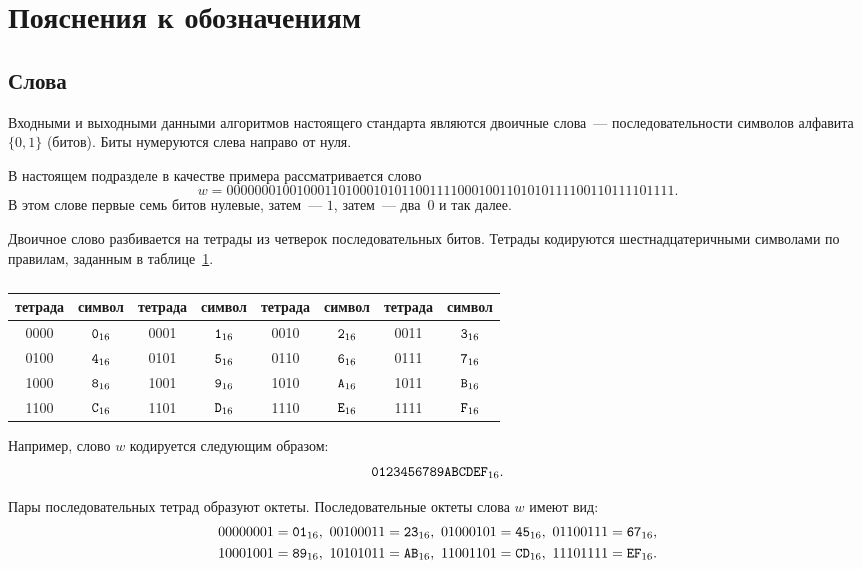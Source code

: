 \section{Пояснения к обозначениям}

\subsection{Слова}

Входными и выходными данными алгоритмов настоящего стандарта 
являются двоичные слова~--- последовательности символов 
алфавита~$\{0,1\}$ (битов). Биты нумеруются слева направо от нуля.

В настоящем подразделе в качестве примера рассматривается слово
$$
w=
0000 0001 0010 0011 0100 0101 0110 0111
1000 1001 1010 1011 1100 1101 1110 1111.
$$
В этом слове первые семь битов нулевые, затем~--- $1$, затем~--- два~$0$ и так далее.

Двоичное слово разбивается на тетрады из четверок последовательных битов.
%
Тетрады кодируются шестнадцатеричными символами по правилам,
заданным в таблице~\ref{Table.Hex}.

\begin{table}[H]
\caption{}\label{Table.Hex}
\begin{tabular}{|c|c||c|c||c|c||c|c|}
\hline
тетрада & символ & тетрада & символ & тетрада & символ & тетрада & символ\\
\hline
0000 & $\texttt{0}_{16}$ & 0001 & $\texttt{1}_{16}$ & 
0010 & $\texttt{2}_{16}$ & 0011 & $\texttt{3}_{16}$\\
0100 & $\texttt{4}_{16}$ & 0101 & $\texttt{5}_{16}$ & 
0110 & $\texttt{6}_{16}$ & 0111 & $\texttt{7}_{16}$\\ 
1000 & $\texttt{8}_{16}$ & 1001 & $\texttt{9}_{16}$ & 
1010 & $\texttt{A}_{16}$ & 1011 & $\texttt{B}_{16}$\\ 
1100 & $\texttt{C}_{16}$ & 1101 & $\texttt{D}_{16}$ & 
1110 & $\texttt{E}_{16}$ & 1111 & $\texttt{F}_{16}$\\ 
\hline
\end{tabular}
\end{table}

Например, слово $w$ кодируется следующим образом:
$$
\texttt{0123456789ABCDEF}_{16}.
$$

Пары последовательных тетрад образуют октеты.
Последовательные октеты слова $w$ имеют вид:
\begin{align*}
&
0000 0001=\hex{01},\ 
0010 0011=\hex{23},\ 
0100 0101=\hex{45},\  
0110 0111=\hex{67},\\
%
&
1000 1001=\hex{89},\ 
1010 1011=\hex{AB},\ 
1100 1101=\hex{CD},\ 
1110 1111=\hex{EF}.
\end{align*}

